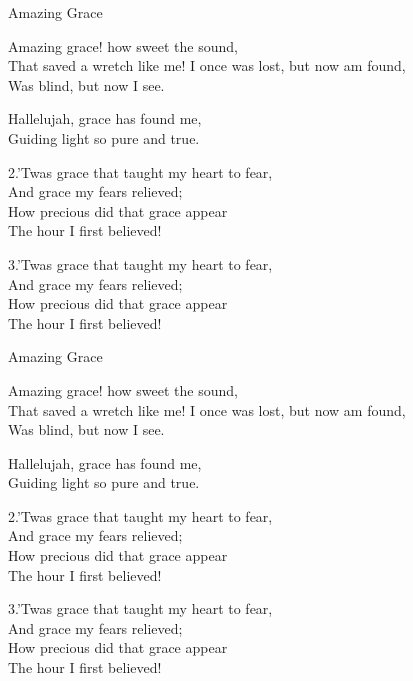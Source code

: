 \documentclass[12pt]{article}
\begin{document}
\begin{hymn}{2}{Amazing Grace}

\begin{stanza}
Amazing grace! how sweet the sound,\\
That saved a wretch like me!
I once was lost, but now am found,\\
Was blind, but now I see.
\end{stanza}

\begin{chorus}
Hallelujah, grace has found me,\\
Guiding light so pure and true.
\end{chorus}

\begin{stanza}
2.’Twas grace that taught my heart to fear,\\
And grace my fears relieved;\\
How precious did that grace appear\\
The hour I first believed!
\end{stanza}

\begin{stanza}
3.’Twas grace that taught my heart to fear,\\
And grace my fears relieved;\\
How precious did that grace appear\\
The hour I first believed!
\end{stanza}
\end{hymn}

\HymnBreak

\begin{hymn}{3}{Amazing Grace}

\begin{stanza}
Amazing grace! how sweet the sound,\\
That saved a wretch like me!
I once was lost, but now am found,\\
Was blind, but now I see.
\end{stanza}

\begin{chorus}
Hallelujah, grace has found me,\\
Guiding light so pure and true.
\end{chorus}

\begin{stanza}
2.’Twas grace that taught my heart to fear,\\
And grace my fears relieved;\\
How precious did that grace appear\\
The hour I first believed!
\end{stanza}

\begin{stanza}
3.’Twas grace that taught my heart to fear,\\
And grace my fears relieved;\\
How precious did that grace appear\\
The hour I first believed!
\end{stanza}
\end{hymn}
\end{document}
